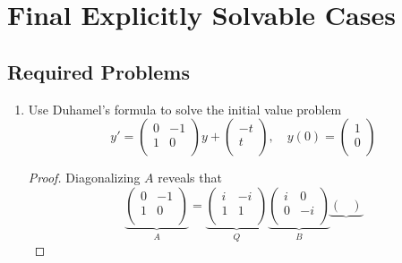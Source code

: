 \documentclass[../psets.tex]{subfiles}
\begin{document}
\section{Final Explicitly Solvable Cases}
\subsection*{Required Problems}
\begin{enumerate}
    \item {}Use Duhamel's formula to solve the initial value problem
    \begin{equation*}
        y' =
        \begin{pmatrix}
            0 & -1\\
            1 & 0\\
        \end{pmatrix}
        y+
        \begin{pmatrix}
            -t\\
            t\\
        \end{pmatrix}
        ,\quad
        y(0) =
        \begin{pmatrix}
            1\\
            0\\
        \end{pmatrix}
    \end{equation*}
    \begin{proof}
        Diagonalizing $A$ reveals that
        \begin{equation*}
            \underbrace{
                \begin{pmatrix}
                    0 & -1\\
                    1 & 0\\
                \end{pmatrix}
            }_A = \underbrace{
                \begin{pmatrix}
                    i & -i\\
                    1 & 1\\
                \end{pmatrix}
            }_Q\underbrace{
                \begin{pmatrix}
                    i & 0\\
                    0 & -i\\
                \end{pmatrix}
            }_B\underbrace{
                \begin{pmatrix}

\end{pmatrix}}
\end{equation*}
\end{proof}
\end{enumerate}
\end{document}
